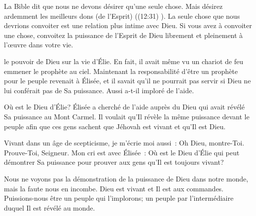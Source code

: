 La Bible dit que nous ne devons désirer qu'une seule chose.
 \og Mais désirez ardemment les meilleurs dons (de l'Esprit) \fg{}
 ((12:31) \KJF).
 La seule chose que nous devrions convoiter est une relation
 plus intime avec Dieu. Si vous avez à convoiter une chose,
 convoitez la puissance de l'Esprit de Dieu librement
 et pleinement à l'\oe{}uvre dans votre vie. 

\dvrule






 le pouvoir de Dieu sur la vie d'Élie.
 En fait, il avait même vu un chariot de feu emmener le prophète au ciel.
 Maintenant la responsabilité d'être un prophète pour le peuple
 revenait à Élisée, et il savait qu'il ne pourrait pas servir si Dieu
 ne lui conférait pas de Sa puissance. Aussi a-t-il imploré de l'aide. 

\og Où est le Dieu d'Élie? \fg{}
 Élisée a cherché de l'aide auprès du Dieu qui avait révélé
 Sa puissance au Mont Carmel. Il voulait qu'Il révèle la même puissance
 devant le peuple afin que ces gens sachent que Jéhovah
 est vivant et qu'Il est Dieu. 


Vivant dans un âge de scepticisme, je m'écrie moi aussi~:
 \og Oh Dieu, montre-Toi. Prouve-Toi, Seigneur. \fg{}
 Mon cri est avec Élisée~: Où est le Dieu d'Élie qui peut démontrer
 Sa puissance pour prouver aux gens qu'Il est toujours vivant? 

Nous ne voyons pas la démonstration de la puissance de Dieu dans notre monde,
 mais la faute nous en incombe. Dieu est vivant et Il est aux commandes.
 Puissions-nous être un peuple qui l'implorons; un peuple par l'intermédiaire
 duquel Il est révélé au monde. 

\dvrule



